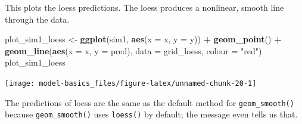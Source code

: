 \documentclass[]{book}
\newenvironment{Shaded}{\begin{snugshade}}{\end{snugshade}}
\newcommand{\DataTypeTok}[1]{\textcolor[rgb]{0.13,0.29,0.53}{#1}}
\newcommand{\KeywordTok}[1]{\textcolor[rgb]{0.13,0.29,0.53}{\textbf{#1}}}
\newcommand{\NormalTok}[1]{#1}
\newcommand{\OperatorTok}[1]{\textcolor[rgb]{0.81,0.36,0.00}{\textbf{#1}}}
\newcommand{\StringTok}[1]{\textcolor[rgb]{0.31,0.60,0.02}{#1}}
\theoremstyle{plain}
\theoremstyle{remark}
\begin{document}
\begin{Shaded}
\end{Shaded}

This plots the loess predictions.
The loess produces a nonlinear, smooth line through the data.

\begin{Shaded}
\begin{Highlighting}[]
\NormalTok{plot_sim1_loess <-}
\StringTok{  }\KeywordTok{ggplot}\NormalTok{(sim1, }\KeywordTok{aes}\NormalTok{(}\DataTypeTok{x =}\NormalTok{ x, }\DataTypeTok{y =}\NormalTok{ y)) }\OperatorTok{+}
\StringTok{  }\KeywordTok{geom_point}\NormalTok{() }\OperatorTok{+}
\StringTok{  }\KeywordTok{geom_line}\NormalTok{(}\KeywordTok{aes}\NormalTok{(}\DataTypeTok{x =}\NormalTok{ x, }\DataTypeTok{y =}\NormalTok{ pred), }\DataTypeTok{data =}\NormalTok{ grid_loess, }\DataTypeTok{colour =} \StringTok{"red"}\NormalTok{)}
\NormalTok{plot_sim1_loess}
\end{Highlighting}
\end{Shaded}

\begin{center}\texttt{[image: model-basics\_files/figure-latex/unnamed-chunk-20-1]} \end{center}

The predictions of loess are the same as the default method for \texttt{geom\_smooth()} because \texttt{geom\_smooth()} uses \texttt{loess()} by default; the message even tells us that.
\end{document}
